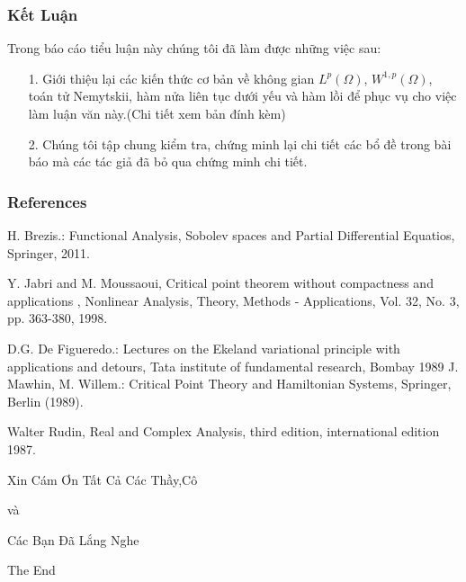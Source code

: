 \documentclass[11pt]{beamer}
\numberwithin{equation}{section}
\theoremstyle{plain}
\theoremstyle{definition}
\theoremstyle{remark}
\begin{document}
\begin{frame}
\frametitle{Kết Luận}
Trong báo cáo tiểu luận này chúng tôi đã làm được những việc sau:
\begin{itemize}
\item[1.] Giới thiệu lại các kiến thức cơ bản về không gian $L^{p}(\Omega)$, $W^{1,p}(\Omega)$, toán tử Nemytskii, hàm nửa liên tục dưới yếu và hàm lồi để phục vụ cho việc làm luận văn này.(Chi tiết xem bản đính kèm)
\item [2.] Chúng tôi tập chung kiểm tra, chứng minh  lại chi tiết các bổ đề trong bài báo \cite{YJMM} mà các tác giả đã bỏ qua chứng minh chi tiết.
\end{itemize}

\end{frame}
\begin{frame}
\frametitle{References}
\indent
\begin{thebibliography}{10}


 H. Brezis.: Functional Analysis, Sobolev spaces
and Partial Differential Equatios, Springer, 2011.

 Y. Jabri and M. Moussaoui, Critical point theorem without compactness and applications , Nonlinear Analysis, Theory, Methods  - Applications, Vol. 32, No. 3, pp. 363-380, 1998.

 D.G. De Figueredo.: Lectures on the Ekeland variational
principle with applications and detours, Tata institute of fundamental
research, Bombay 1989
 J. Mawhin, M. Willem.: Critical Point Theory and
Hamiltonian Systems, Springer, Berlin (1989). 

 Walter Rudin, Real and Complex Analysis, third edition, international edition 1987.
\end{thebibliography}
\end{frame}

\begin{frame}
\Huge{\centerline{Xin Cám Ơn Tất Cả Các Thầy,Cô}}
\Huge{\centerline{và}}
\Huge{\centerline{Các Bạn Đã Lắng Nghe}}
\end{frame}



\begin{frame}
\Huge{\centerline{The End}}
\end{frame}

\end{document}
